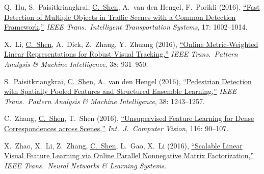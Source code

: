 \documentclass[9pt, a4paper]{article}
\newcommand{\years}[1]{\marginnote{\scriptsize #1}}
\def\highlight{\uline}
\begin{document}
\medskip

\years{2016} Q.~Hu, S.~Paisitkriangkrai, \highlight{C.~Shen}, A.~van den Hengel, F.~Porikli (2016),
\href{http://www.google.com/search?lr=&ie=UTF-8&oe=UTF-8&q=Fast+Detection+of+Multiple+Objects+in+Traffic+Scenes+with+a+Common+Detection+Framework+Qichang+Hu%2C+Sakrapee+Paisitkriangkrai%2C+Chunhua+Shen%2C+Anton+van+den+Hengel%2C+Fatih+Porikli}{``Fast Detection of Multiple Objects in Traffic Scenes with a Common Detection Framework,{}''}
\emph{IEEE Trans.\  Intelligent Transportation Systems}, 17: 1002--1014.

\medskip

\years{2016} X.~Li, \highlight{C.~Shen}, A.~Dick, Z.~Zhang, Y.~Zhuang (2016),
\href{http://www.google.com/search?lr=&ie=UTF-8&oe=UTF-8&q=Online+Metric-Weighted+Linear+Representations+for+Robust+Visual+Tracking+Xi+Li%2C+Chunhua+Shen%2C+Anthony+Dick%2C+Zhongfei+Zhang%2C+Yueting+Zhuang}{``Online Metric-Weighted Linear Representations for Robust Visual Tracking,{}''}
\emph{IEEE Trans.\  Pattern Analysis \& Machine Intelligence}, 38: 931--950.

\medskip

\years{2016} S.~Paisitkriangkrai, \highlight{C.~Shen}, A.~van den Hengel (2016),
\href{http://www.google.com/search?lr=&ie=UTF-8&oe=UTF-8&q=Pedestrian+Detection+with+Spatially+Pooled+Features+and+Structured+Ensemble+Learning+Sakrapee+Paisitkriangkrai%2C+Chunhua+Shen%2C+Anton+van+den+Hengel}{``Pedestrian Detection with Spatially Pooled Features and Structured Ensemble Learning,{}''}
\emph{IEEE Trans.\  Pattern Analysis \& Machine Intelligence}, 38: 1243--1257.

\medskip

\years{2016} C.~Zhang, \highlight{C.~Shen}, T.~Shen (2016),
\href{http://www.google.com/search?lr=&ie=UTF-8&oe=UTF-8&q=Unsupervised+Feature+Learning+for+Dense+Correspondences+across+Scenes+Chao+Zhang%2C+Chunhua+Shen%2C+Tingzhi+Shen}{``Unsupervised Feature Learning for Dense Correspondences across Scenes,{}''}
\emph{Int.\ J.\  Computer Vision}, 116: 90--107.

\medskip

\years{2016} X.~Zhao, X.~Li, Z.~Zhang, \highlight{C.~Shen}, L.~Gao, X.~Li (2016),
\href{http://www.google.com/search?lr=&ie=UTF-8&oe=UTF-8&q=Scalable+Linear+Visual+Feature+Learning+via+Online+Parallel+Nonnegative+Matrix+Factorization+Xueyi+Zhao%2C+Xi+Li%2C+Zhongfei+Zhang%2C+Chunhua+Shen%2C+Lixin+Gao%2C+Xuelong+Li}{``Scalable Linear Visual Feature Learning via Online Parallel Nonnegative Matrix Factorization,{}''}
\emph{IEEE Trans.\  Neural Networks \& Learning Systems}.
\end{document}
